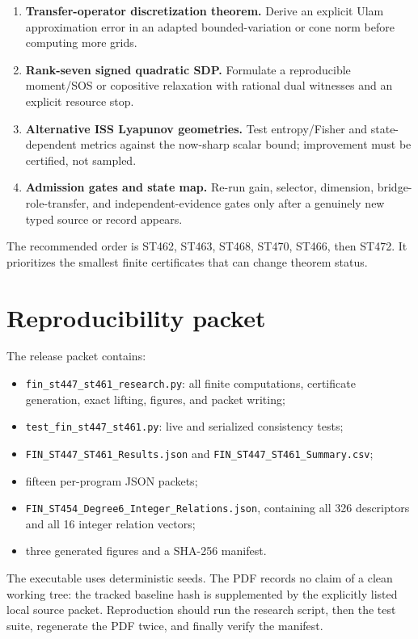 \documentclass[11pt,a4paper]{article}
\begin{document}
\begin{enumerate}[label=\textbf{ST\arabic*:},start=462,leftmargin=2.2cm]
\item \textbf{Transfer-operator discretization theorem.}  Derive an explicit
Ulam approximation error in an adapted bounded-variation or cone norm before
computing more grids.
\item \textbf{Rank-seven signed quadratic SDP.}  Formulate a reproducible
moment/SOS or copositive relaxation with rational dual witnesses and an
explicit resource stop.
\item \textbf{Alternative ISS Lyapunov geometries.}  Test entropy/Fisher and
state-dependent metrics against the now-sharp scalar bound; improvement must
be certified, not sampled.
\item \textbf{Admission gates and state map.}  Re-run gain, selector,
dimension, bridge-role-transfer, and independent-evidence gates only after a
genuinely new typed source or record appears.
\end{enumerate}

The recommended order is ST462, ST463, ST468, ST470, ST466, then ST472.  It
prioritizes the smallest finite certificates that can change theorem status.

\section{Reproducibility packet}\label{sec:repro}

The release packet contains:
\begin{itemize}
\item \texttt{fin\_st447\_st461\_research.py}: all finite computations,
certificate generation, exact lifting, figures, and packet writing;
\item \texttt{test\_fin\_st447\_st461.py}: live and serialized consistency
tests;
\item \texttt{FIN\_ST447\_ST461\_Results.json} and
\texttt{FIN\_ST447\_ST461\_Summary.csv};
\item fifteen per-program JSON packets;
\item \texttt{FIN\_ST454\_Degree6\_Integer\_Relations.json}, containing all
326 descriptors and all 16 integer relation vectors;
\item three generated figures and a SHA-256 manifest.
\end{itemize}

The executable uses deterministic seeds.  The PDF records no claim of a clean
working tree: the tracked baseline hash is supplemented by the explicitly
listed local source packet.  Reproduction should run the research script,
then the test suite, regenerate the PDF twice, and finally verify the manifest.
\end{document}
